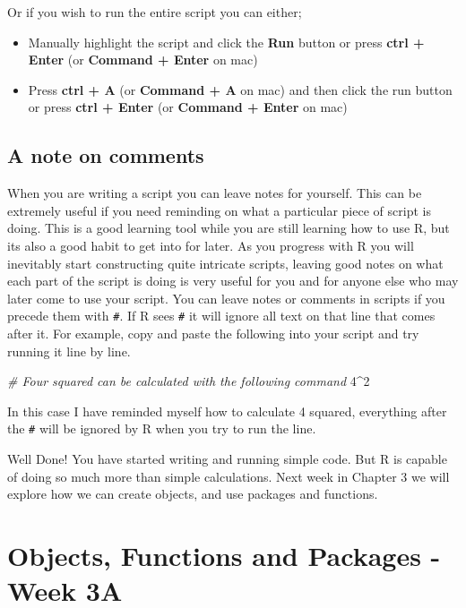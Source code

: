 \documentclass[
]{book}
\newenvironment{Shaded}{\begin{snugshade}}{\end{snugshade}}
\newcommand{\CommentTok}[1]{\textcolor[rgb]{0.56,0.35,0.01}{\textit{#1}}}
\newcommand{\DecValTok}[1]{\textcolor[rgb]{0.00,0.00,0.81}{#1}}
\newcommand{\SpecialCharTok}[1]{\textcolor[rgb]{0.00,0.00,0.00}{#1}}
\providecommand{\tightlist}{%
  \setlength{\itemsep}{0pt}\setlength{\parskip}{0pt}}
\begin{document}
Or if you wish to run the entire script you can either;

\begin{itemize}
\tightlist
\item
  Manually highlight the script and click the \textbf{Run} button or press \textbf{ctrl + Enter} (or \textbf{Command + Enter} on mac)
\item
  Press \textbf{ctrl + A} (or \textbf{Command + A} on mac) and then click the run button or press \textbf{ctrl + Enter} (or \textbf{Command + Enter} on mac)
\end{itemize}

\hypertarget{a-note-on-comments}{%
\section{A note on comments}\label{a-note-on-comments}}

When you are writing a script you can leave notes for yourself. This can be extremely useful if you need reminding on what a particular piece of script is doing. This is a good learning tool while you are still learning how to use R, but its also a good habit to get into for later. As you progress with R you will inevitably start constructing quite intricate scripts, leaving good notes on what each part of the script is doing is very useful for you and for anyone else who may later come to use your script. You can leave notes or comments in scripts if you precede them with \texttt{\#}. If R sees \texttt{\#} it will ignore all text on that line that comes after it. For example, copy and paste the following into your script and try running it line by line.

\begin{Shaded}
\begin{Highlighting}[]
\CommentTok{\# Four squared can be calculated with the following command}
\DecValTok{4}\SpecialCharTok{\^{}}\DecValTok{2}
\end{Highlighting}
\end{Shaded}

In this case I have reminded myself how to calculate 4 squared, everything after the \texttt{\#} will be ignored by R when you try to run the line.

Well Done! You have started writing and running simple code. But R is capable of doing so much more than simple calculations. Next week in Chapter 3 we will explore how we can create objects, and use packages and functions.

\hypertarget{objects-functions-and-packages---week-3a}{%
\chapter{Objects, Functions and Packages - Week 3A}\label{objects-functions-and-packages---week-3a}}
\end{document}
